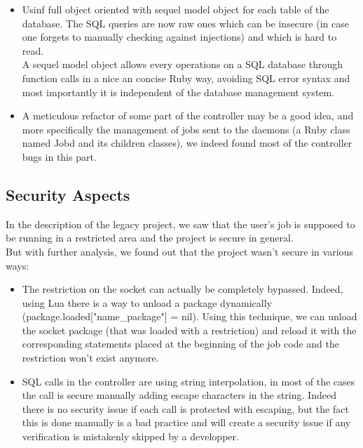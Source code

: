 \documentclass{eplmastersthesis}
\begin{document}
          \begin{itemize}
            \item Usinf full object oriented with sequel \cite{Sequel} model
            object for each table of the database. The SQL queries are now
            raw ones which can be insecure (in case one forgets to manually
            checking against injections) and which is hard to read.\\
            A sequel model object allows every operations on a SQL database
            through function calls in a nice an concise Ruby way, avoiding
            SQL error syntax and most importantly it is independent of the
            database management system.
            \item A meticulous refactor of some part of the controller may be
            a good idea, and more specifically the management of jobs sent to
            the daemons (a Ruby class named Jobd and its children classes), we
            indeed found most of the controller bugs in this part.
          \end{itemize}

      \subsection{Security Aspects }

        In the description of the legacy project, we saw that the user's job is
        supposed to be running in a restricted area and the project is secure in
        general.\\
        But with further analysis, we found out that the project wasn't secure
        in various ways:\\
        \begin{itemize}
          \item The restriction on the socket can actually be completely
          bypassed. Indeed, using Lua there is a way to unload a package
          dynamically (package.loaded["name\_package"] = nil). Using this
          technique, we can unload the socket package (that was loaded with a
          restriction) and reload it with the corresponding statements placed
          at the beginning of the job code and the restriction won't exist
          anymore.
          \item SQL calls in the controller are using string interpolation,
          in most of the cases the call is secure manually adding escape
          characters in the string. Indeed there is no security issue if
          each call is protected with escaping, but the fact this is done
          manually is a bad practice and will create a security issue if
          any verification is mistakenly skipped by a developper.
        \end{itemize}
\end{document}

